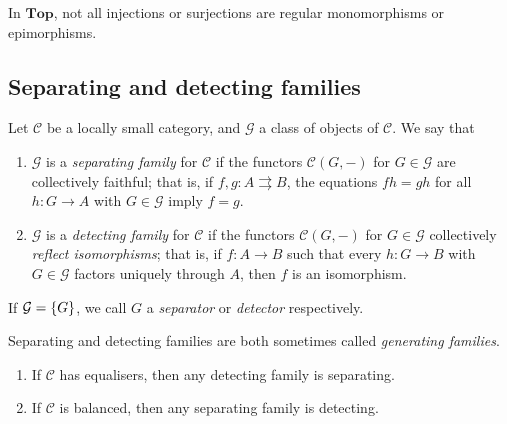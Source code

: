 In \( \mathbf{Top} \), not all injections or surjections are regular monomorphisms or epimorphisms.

\subsection{Separating and detecting families}
\begin{definition}
    Let \( \mathcal C \) be a locally small category, and \( \mathcal G \) a class of objects of \( \mathcal C \).
    We say that
    \begin{enumerate}
        \item \( \mathcal G \) is a \emph{separating family} for \( \mathcal C \) if the functors \( \mathcal C(G, -) \) for \( G \in \mathcal G \) are collectively faithful; that is, if \( f, g : A \rightrightarrows B \), the equations \( fh = gh \) for all \( h : G \to A \) with \( G \in \mathcal G \) imply \( f = g \).
        \item \( \mathcal G \) is a \emph{detecting family} for \( \mathcal C \) if the functors \( \mathcal C(G, -) \) for \( G \in \mathcal G \) collectively \emph{reflect isomorphisms}; that is, if \( f : A \to B \) such that every \( h : G \to B \) with \( G \in \mathcal G \) factors uniquely through \( A \), then \( f \) is an isomorphism.
    \end{enumerate}
    If \( \mathcal G = \qty{G} \), we call \( G \) a \emph{separator} or \emph{detector} respectively.
\end{definition}
Separating and detecting families are both sometimes called \emph{generating families}.
\begin{lemma}
    \begin{enumerate}
        \item If \( \mathcal C \) has equalisers, then any detecting family is separating.
        \item If \( \mathcal C \) is balanced, then any separating family is detecting. 
    \end{enumerate}
\end{lemma}
